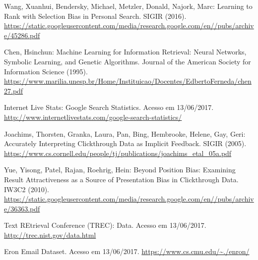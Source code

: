 \documentclass{svproc}
\begin{document}
\begin{thebibliography}{6}
%

Wang, Xuanhui, Bendersky, Michael, Metzler, Donald, Najork, Marc: Learning to Rank with Selection Bias in Personal Search.
SIGIR (2016). \url{https://static.googleusercontent.com/media/research.google.com/en//pubs/archive/45286.pdf}

Chen, Hsinchun: Machine Learning for Information Retrieval: Neural Networks, Symbolic Learning, and Genetic Algorithms.
Journal of the American Society for Information Science (1995). \url{https://www.marilia.unesp.br/Home/Instituicao/Docentes/EdbertoFerneda/chen27.pdf}

Internet Live Stats: Google Search Statistics.
Acesso em 13/06/2017. \url{http://www.internetlivestats.com/google-search-statistics/}

Joachims, Thorsten, Granka, Laura, Pan, Bing, Hembrooke, Helene, Gay, Geri: Accurately Interpreting Clickthrough Data as Implicit
Feedback.
SIGIR (2005). \url{https://www.cs.cornell.edu/people/tj/publications/joachims_etal_05a.pdf}

Yue, Yisong, Patel, Rajan, Roehrig, Hein: Beyond Position Bias: Examining Result Attractiveness as
a Source of Presentation Bias in Clickthrough Data.
IW3C2 (2010). \url{https://static.googleusercontent.com/media/research.google.com/en//pubs/archive/36363.pdf}

Text REtrieval Conference (TREC): Data.
Acesso em 13/06/2017. \url{http://trec.nist.gov/data.html}

Eron Email Dataset.
Acesso em 13/06/2017. \url{https://www.cs.cmu.edu/~./enron/}

\end{thebibliography}
\end{document}
